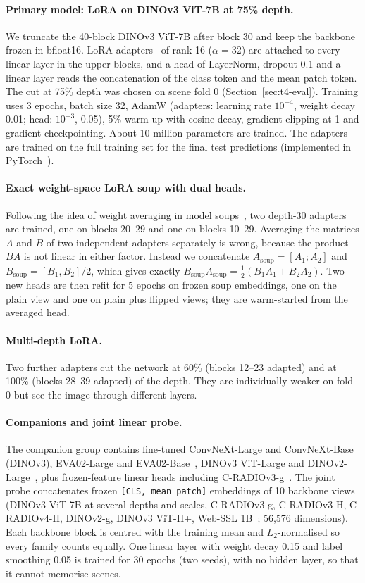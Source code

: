 \documentclass[../main.tex]{subfiles}
\begin{document}
\paragraph{Primary model: LoRA on DINOv3 ViT-7B at 75\% depth.} We truncate the 40-block DINOv3 ViT-7B after block 30 and keep the backbone frozen in bfloat16. LoRA adapters~\citep{lora} of rank 16 ($\alpha=32$) are attached to every linear layer in the upper blocks, and a head of LayerNorm, dropout 0.1 and a linear layer reads the concatenation of the class token and the mean patch token. The cut at 75\% depth was chosen on scene fold 0 (Section~\ref{sec:t4-eval}). Training uses 3 epochs, batch size 32, AdamW (adapters: learning rate $10^{-4}$, weight decay 0.01; head: $10^{-3}$, 0.05), 5\% warm-up with cosine decay, gradient clipping at 1 and gradient checkpointing. About 10 million parameters are trained. The adapters are trained on the full training set for the final test predictions (implemented in PyTorch~\citep{pytorch}).

\paragraph{Exact weight-space LoRA soup with dual heads.} Following the idea of weight averaging in model soups~\citep{modelsoup}, two depth-30 adapters are trained, one on blocks 20--29 and one on blocks 10--29. Averaging the matrices $A$ and $B$ of two independent adapters separately is wrong, because the product $BA$ is not linear in either factor. Instead we concatenate $A_{\text{soup}}=[A_1;A_2]$ and $B_{\text{soup}}=[B_1,B_2]/2$, which gives exactly $B_{\text{soup}}A_{\text{soup}}=\tfrac12(B_1A_1+B_2A_2)$. Two new heads are then refit for 5 epochs on frozen soup embeddings, one on the plain view and one on plain plus flipped views; they are warm-started from the averaged head.

\paragraph{Multi-depth LoRA.} Two further adapters cut the network at 60\% (blocks 12--23 adapted) and at 100\% (blocks 28--39 adapted) of the depth. They are individually weaker on fold 0 but see the image through different layers.

\paragraph{Companions and joint linear probe.} The companion group contains fine-tuned ConvNeXt-Large and ConvNeXt-Base~\citep{convnext} (DINOv3), EVA02-Large and EVA02-Base~\citep{eva02}, DINOv3 ViT-Large and DINOv2-Large~\citep{dinov2}, plus frozen-feature linear heads including C-RADIOv3-g~\citep{radio}. The joint probe concatenates frozen \texttt{[CLS, mean patch]} embeddings of 10 backbone views (DINOv3 ViT-7B at several depths and scales, C-RADIOv3-g, C-RADIOv3-H, C-RADIOv4-H, DINOv2-g, DINOv3 ViT-H+, Web-SSL 1B~\citep{webssl}; 56,576 dimensions). Each backbone block is centred with the training mean and $L_2$-normalised so every family counts equally. One linear layer with weight decay 0.15 and label smoothing 0.05 is trained for 30 epochs (two seeds), with no hidden layer, so that it cannot memorise scenes.
\end{document}
